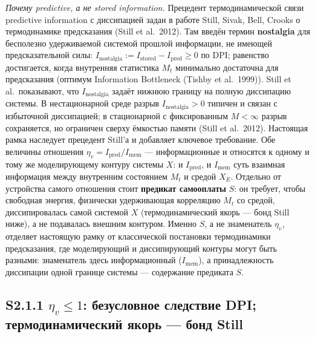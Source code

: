 \documentclass[pdflatex,sn-mathphys-ay]{sn-jnl}
\begin{document}
\emph{Почему predictive, а не stored information.} Прецедент термодинамической связи predictive information с диссипацией задан в работе Still, Sivak, Bell, Crooks о термодинамике предсказания (Still et al.~2012). Там введён термин \textbf{nostalgia} для бесполезно удерживаемой системой прошлой информации, не имеющей предсказательной силы: \(I_{\text{nostalgia}} := I_{\text{stored}} - I_{\text{pred}} \ge 0\) по DPI; равенство достигается, когда внутренняя статистика \(M_t\) минимально достаточна для предсказания (оптимум Information Bottleneck (Tishby et al.~1999)). Still et al.~показывают, что \(I_{\text{nostalgia}}\) задаёт нижнюю границу на полную диссипацию системы. В нестационарной среде разрыв \(I_{\text{nostalgia}} > 0\) типичен и связан с избыточной диссипацией; в стационарной с фиксированным \(M < \infty\) разрыв сохраняется, но ограничен сверху ёмкостью памяти (Still et al.~2012). Настоящая рамка наследует прецедент Still'а и добавляет ключевое требование. Обе величины отношения \(\eta_v = I_{\text{pred}}/I_{\text{mem}}\) --- информационные и относятся к одному и тому же моделирующему контуру системы \(X\): и \(I_{\text{pred}}\), и \(I_{\text{mem}}\) суть взаимная информация между внутренним состоянием \(M_t\) и средой \(X_E\). Отдельно от устройства самого отношения стоит \textbf{предикат самооплаты} \(S\): он требует, чтобы свободная энергия, физически удерживающая корреляцию \(M_t\) со средой, диссипировалась самой системой \(X\) (термодинамический якорь --- бонд Still ниже), а не подавалась внешним контуром. Именно \(S\), а не знаменатель \(\eta_v\), отделяет настоящую рамку от классической постановки термодинамики предсказания, где моделирующий и диссипирующий контуры могут быть разными: знаменатель здесь информационный (\(I_{\text{mem}}\)), а принадлежность диссипации одной границе системы --- содержание предиката \(S\).

\subsection*{\texorpdfstring{S2.1.1 \(\eta_v \le 1\): безусловное следствие DPI; термодинамический якорь --- бонд Still}{S2.1.1 \textbackslash eta\_v \textbackslash le 1: безусловное следствие DPI; термодинамический якорь --- бонд Still}}\label{s2.1.1-eta_v-le-1-ux431ux435ux437ux443ux441ux43bux43eux432ux43dux43eux435-ux441ux43bux435ux434ux441ux442ux432ux438ux435-dpi-ux442ux435ux440ux43cux43eux434ux438ux43dux430ux43cux438ux447ux435ux441ux43aux438ux439-ux44fux43aux43eux440ux44c-ux431ux43eux43dux434-still}
\end{document}
